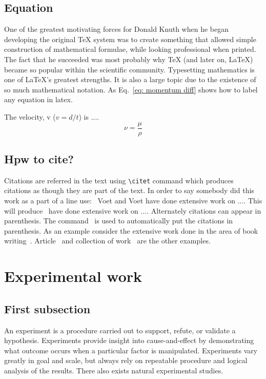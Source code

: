 \documentclass[11pt, a4paper]{article}
\begin{document}
\subsection{Equation}
One of the greatest motivating forces for Donald Knuth when he began developing the original TeX system was to create something that allowed simple construction of mathematical formulae, while looking professional when printed. The fact that he succeeded was most probably why TeX (and later on, LaTeX) became so popular within the scientific community. Typesetting mathematics is one of LaTeX's greatest strengths. It is also a large topic due to the existence of so much mathematical notation. As Eq.~\ref{eq: momentum diff} shows how to label any equation in latex. 

The velocity, v ($v=d/t$) is ....
%
\begin{equation}\label{eq: momentum diff}
\nu = \frac{\mu}{\rho}
\end{equation}

\subsection{Hpw to cite?}
Citations are referred in the text using \verb|\citet| command which produces citations
as though they are part of the text. In order to say somebody did this work as a part of a line use:~ Voet and Voet have done extensive work on .... This will produce~\citet{voet2011biochemistry} have done extensive work on .... Alternately citations can appear in parenthesis. The command~\citep{voet2011biochemistry} is used to automatically put the citations in parenthesis. As an example consider the extensive work done in the area of book writing~\citep{seifert1991shape}.
Article~\citep{sircar1972adsorption,keh1995particle} and collection of work~\citep{seifert1995morphology} are the other examples.

\section{Experimental work}\label{sec:exp}

\subsection{First subsection}
An experiment is a procedure carried out to support, refute, or validate a hypothesis. Experiments provide insight into cause-and-effect by demonstrating what outcome occurs when a particular factor is manipulated. Experiments vary greatly in goal and scale, but always rely on repeatable procedure and logical analysis of the results. There also exists natural experimental studies.
\end{document}
